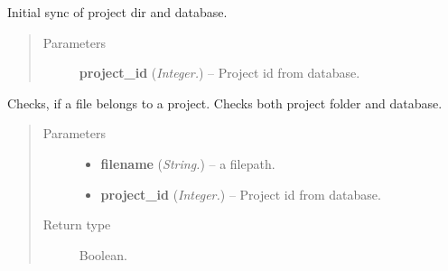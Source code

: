 \documentclass[letterpaper,10pt,english]{sphinxmanual}
\begin{document}

\begin{fulllineitems}
\label{api:controller.InitSyncProjectDir}
Initial sync of project dir and database.
\begin{quote}\begin{description}
\item[{Parameters}] \leavevmode
\textbf{project\_id} (\emph{Integer.}) -- Project id from database.

\end{description}\end{quote}

\end{fulllineitems}


\begin{fulllineitems}
\label{api:controller.IsProjectFile}
Checks, if a file belongs to a project. Checks both project folder
and database.
\begin{quote}\begin{description}
\item[{Parameters}] \leavevmode\begin{itemize}
\item {} 
\textbf{filename} (\emph{String.}) -- a filepath.

\item {} 
\textbf{project\_id} (\emph{Integer.}) -- Project id from database.

\end{itemize}

\item[{Return type}] \leavevmode
Boolean.

\end{description}\end{quote}

\end{fulllineitems}

\end{document}
